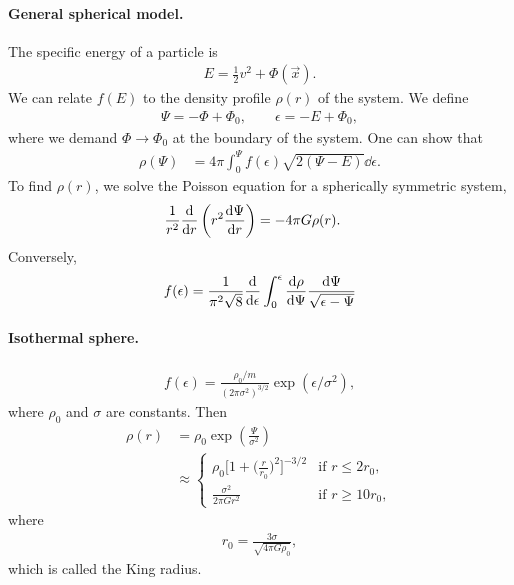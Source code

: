 \paragraph*{General spherical model.}
The specific energy of a particle is
\begin{align*}
	E = \frac{1}{2} v^2 + \Phi(\vec{x}).
\end{align*}
We can relate $f(E)$ to the density profile $\rho(r)$ of the system. We define
\begin{align*}
	\Psi = - \Phi + \Phi_0, \qquad
	\epsilon = - E + \Phi_0,
\end{align*}
where we demand $\Phi \to \Phi_0$ at the boundary of the system. One can show that
\begin{align*}
	\rho(\Psi)
	&= 4 \pi \int_0^\Psi f(\epsilon) \sqrt{2(\Psi - E)} \dd{\epsilon}.
\end{align*}
To find $\rho(r)$, we solve the Poisson equation for a spherically symmetric system,
\begin{align*}
	\frac{1}{r^2} \dv{}{r} \left( r^2 \dv{\Psi}{r} \right)
	&= - 4 \pi G \rho(r).
\end{align*}
Conversely,
\begin{align*}
	f(\epsilon)
	= \frac{1}{\pi^2 \sqrt{8}}
	\dv{}{\epsilon}
	\int_0^\epsilon \dv{\rho}{\Psi} \frac{\dd{\Psi}}{\sqrt{\epsilon-\Psi}}
\end{align*}

\paragraph*{Isothermal sphere.}
\begin{align*}
	f(\epsilon)
	= \frac{\rho_0/m}{(2\pi\sigma^2)^{3/2}} \exp(\epsilon/\sigma^2),
\end{align*}
where $\rho_0$ and $\sigma$ are constants. Then
\begin{align*}
	\rho(r) 
	&= \rho_0 \exp\left( \frac{\Psi}{\sigma^2} \right)\\
	&\approx
	\begin{cases}
		\rho_0   \Big[ 1 + \Big( \frac{r}{r_0} \Big)^2 \Big]^{-3/2}
		& \text{if } r \leq 2 r_0,\\
		\frac{\sigma^2}{2\pi G r^2}
		& \text{if } r \geq 10 r_0,
	\end{cases}
\end{align*}
where
\begin{align*}
	r_0 = \frac{3\sigma}{\sqrt{4\pi G \rho_0}},
\end{align*}
which is called the King radius.

